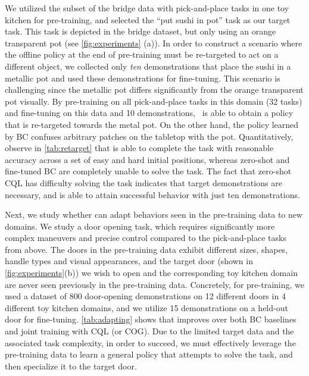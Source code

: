 
\noindent We utilized the subset of the bridge data with pick-and-place tasks in one toy kitchen for pre-training, and selected the ``put sushi in pot'' task as our target task. This task is depicted in the bridge dataset, but only using an orange transparent pot (see \autoref{fig:experiments} (a)). In order to construct a scenario where the offline policy at the end of pre-training must be re-targeted to act on a different object, we collected only \emph{ten} demonstrations that place the sushi in a metallic pot and used these demonstrations for fine-tuning.
This scenario is challenging since the metallic pot differs significantly from the orange transparent pot visually. 
By pre-training on all pick-and-place tasks in this domain (32 tasks) and fine-tuning on this data and 10 demonstrations, \ptrmethodname\ is able to obtain a policy that is re-targeted towards the metal pot. On the other hand, the policy learned by BC confuses arbitrary patches on the tabletop with the pot. Quantitatively, observe in \autoref{tab:retarget} that \ptrmethodname is able to complete the task with reasonable accuracy across a set of easy and hard initial positions, whereas zero-shot and fine-tuned BC are completely unable to solve the task. The fact that zero-shot CQL has difficulty solving the task indicates that target demonstrations are necessary, and \ptrmethodname is able to attain successful behavior with just ten demonstrations.


\noindent Next, we study whether \ptrmethodname can adapt behaviors seen in the pre-training data to new domains. We study a door opening task, which requires significantly more complex maneuvers and precise control compared to the pick-and-place tasks from above. 
The doors in the pre-training data exhibit different sizes, shapes, handle types and visual appearances, and the target door (shown in \autoref{fig:experiments}(b)) we wish to open and the corresponding toy kitchen domain are never seen previously in the pre-training data. Concretely, for pre-training, we used a dataset of 800 door-opening demonstrations on 12 different doors in 4 different toy kitchen domains, and we utilize 15 demonstrations on a held-out door for fine-tuning. \autoref{tab:adapting} shows that \ptrmethodname improves over both BC baselines and joint training with CQL (or COG). Due to the limited target data and the associated task complexity, in order to succeed, we must effectively leverage the pre-training data to learn a general policy that attempts to solve the task, and then specialize it to the target door.

